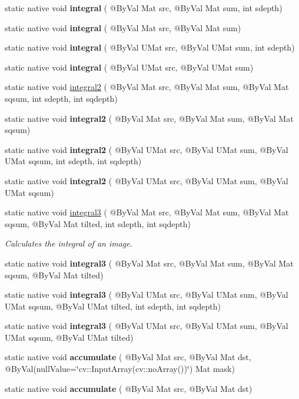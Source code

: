 \begin{DoxyCompactItemize}
static native void {\bfseries integral} ( @By\+Val Mat src, @By\+Val Mat sum, int sdepth)
\item 
static native void {\bfseries integral} ( @By\+Val Mat src, @By\+Val Mat sum)
\item 
static native void {\bfseries integral} ( @By\+Val U\+Mat src, @By\+Val U\+Mat sum, int sdepth)
\item 
static native void {\bfseries integral} ( @By\+Val U\+Mat src, @By\+Val U\+Mat sum)
\item 
static native void \hyperlink{group__imgproc__misc_ga7c3e8cf075507c80c07a1fd8cd8969de}{integral2} ( @By\+Val Mat src, @By\+Val Mat sum, @By\+Val Mat sqsum, int sdepth, int sqdepth)
\item 
static native void {\bfseries integral2} ( @By\+Val Mat src, @By\+Val Mat sum, @By\+Val Mat sqsum)
\item 
static native void {\bfseries integral2} ( @By\+Val U\+Mat src, @By\+Val U\+Mat sum, @By\+Val U\+Mat sqsum, int sdepth, int sqdepth)
\item 
static native void {\bfseries integral2} ( @By\+Val U\+Mat src, @By\+Val U\+Mat sum, @By\+Val U\+Mat sqsum)
\item 
static native void \hyperlink{group__imgproc__misc_gaac16fc19a4025e3133ded033405c8e25}{integral3} ( @By\+Val Mat src, @By\+Val Mat sum, @By\+Val Mat sqsum, @By\+Val Mat tilted, int sdepth, int sqdepth)
\begin{DoxyCompactList}\small\item\em Calculates the integral of an image. \end{DoxyCompactList}\item 
static native void {\bfseries integral3} ( @By\+Val Mat src, @By\+Val Mat sum, @By\+Val Mat sqsum, @By\+Val Mat tilted)
\item 
static native void {\bfseries integral3} ( @By\+Val U\+Mat src, @By\+Val U\+Mat sum, @By\+Val U\+Mat sqsum, @By\+Val U\+Mat tilted, int sdepth, int sqdepth)
\item 
static native void {\bfseries integral3} ( @By\+Val U\+Mat src, @By\+Val U\+Mat sum, @By\+Val U\+Mat sqsum, @By\+Val U\+Mat tilted)
\item 
static native void {\bfseries accumulate} ( @By\+Val Mat src, @By\+Val Mat dst, @By\+Val(null\+Value=\char`\"{}cv\+::\+Input\+Array(cv\+::no\+Array())\char`\"{}) Mat mask)
\item 
static native void {\bfseries accumulate} ( @By\+Val Mat src, @By\+Val Mat dst)
\item 

\end{DoxyCompactItemize}
